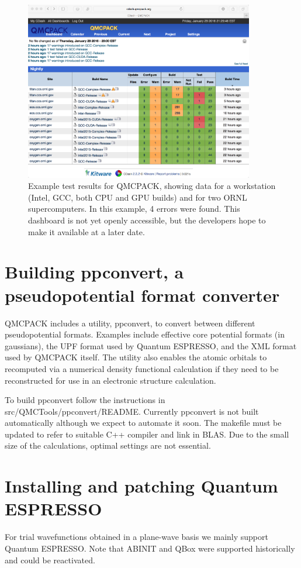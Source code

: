 \begin{figure}
  \centering
  \includegraphics[width=10cm]{figures/QMCPACK_CDash_CTest_Results_20160129.png}
  \caption{Example test results for QMCPACK, showing data for a
    workstation (Intel, GCC, both CPU and GPU builds) and for two ORNL
    supercomputers. In this example, 4 errors were found. This
    dashboard is not yet openly accessible, but the developers hope
    to make it available at a later date.}
  \label{fig:cdash}
\end{figure}

\section{Building ppconvert, a pseudopotential format converter}
\label{sec:buildppconvert}
QMCPACK includes a utility, ppconvert, to convert between different
pseudopotential formats. Examples include effective core potential
formats (in gaussians), the UPF format used by Quantum ESPRESSO, and
the XML format used by QMCPACK itself. The utility also enables the
atomic orbitals to recomputed via a numerical density functional
calculation if they need to be reconstructed for use in an
electronic structure calculation.

To build ppconvert follow the instructions in
src/QMCTools/ppconvert/README. Currently ppconvert is not built
automatically although we expect to automate it soon. The makefile
must be updated to refer to suitable C++ compiler and link in
BLAS. Due to the small size of the calculations, optimal settings are
not essential.

\section{Installing and patching Quantum ESPRESSO}
\label{sec:buildqe}
For trial wavefunctions obtained in a plane-wave basis we mainly
support Quantum ESPRESSO. Note that ABINIT and QBox were supported historically
and could be reactivated.

